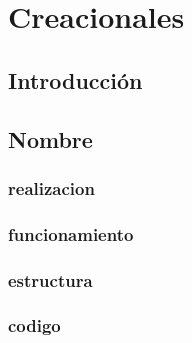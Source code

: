 \chapter{Creacionales}
\section{Introducción}
\newpage
\section{Nombre}
\subsection{realizacion}
\newpage
\subsection{funcionamiento}
\newpage
\subsection{estructura}
\newpage
\subsection{codigo}
%		
%			
%			
%			
\newpage